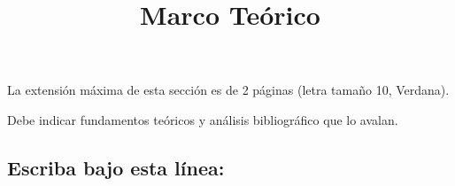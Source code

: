 \documentclass[10pt,prl]{revtex4}
\begin{document}
\title{ Marco Te\'orico}
\maketitle

La extensi\'on m\'axima de esta secci\'on es de 2 p\'aginas (letra tama\~no 10, Verdana).

Debe indicar fundamentos te\'oricos y an\'alisis bibliogr\'afico que lo avalan.

\maketitle
\subsection{Escriba bajo esta l\'inea:}
\end{document}
